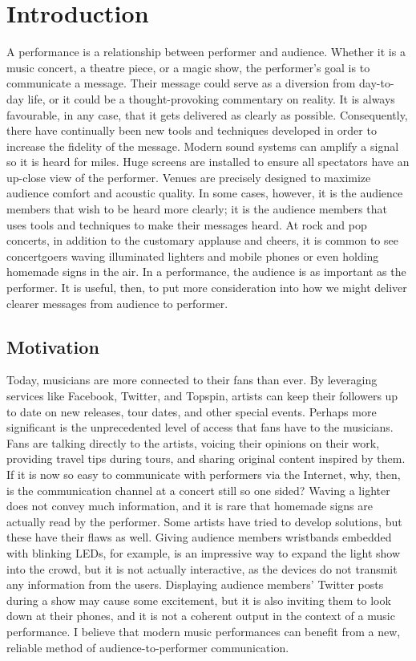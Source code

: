 \chapter{Introduction}

A performance is a relationship between performer and audience. Whether it is a music concert, a theatre piece, or a magic show, the performer's goal is to communicate a message. Their message could serve as a diversion from day-to-day life, or it could be a thought-provoking commentary on reality. It is always favourable, in any case, that it gets delivered as clearly as possible. Consequently, there have continually been new tools and techniques developed in order to increase the fidelity of the message. Modern sound systems can amplify a signal so it is heard for miles. Huge screens are installed to ensure all spectators have an up-close view of the performer. Venues are precisely designed to maximize audience comfort and acoustic quality. In some cases, however, it is the audience members that wish to be heard more clearly; it is the audience members that uses tools and techniques to make their messages heard. At rock and pop concerts, in addition to the customary applause and cheers, it is common to see concertgoers waving illuminated lighters and mobile phones or even holding homemade signs in the air. In a performance, the audience is as important as the performer. It is useful, then, to put more consideration into how we might deliver clearer messages from audience to performer.

\section{Motivation}

Today, musicians are more connected to their fans than ever. By leveraging services like Facebook, Twitter, and Topspin, artists can keep their followers up to date on new releases, tour dates, and other special events. Perhaps more significant is the unprecedented level of access that fans have to the musicians. Fans are talking directly to the artists, voicing their opinions on their work, providing travel tips during tours, and sharing original content inspired by them. If it is now so easy to communicate with performers via the Internet, why, then, is the communication channel at a concert still so one sided? Waving a lighter does not convey much information, and it is rare that homemade signs are actually read by the performer. Some artists have tried to develop solutions, but these have their flaws as well. Giving audience members wristbands embedded with blinking LEDs, for example, is an impressive way to expand the light show into the crowd, but it is not actually interactive, as the devices do not transmit any information from the users. Displaying audience members' Twitter posts during a show may cause some excitement, but it is also inviting them to look down at their phones, and it is not a coherent output in the context of a music performance. I believe that modern music performances can benefit from a new, reliable method of audience-to-performer communication.

